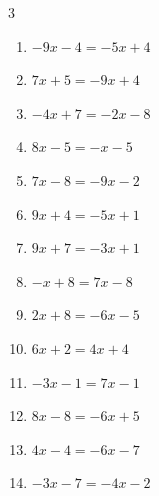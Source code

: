 \begin{multicols}{3}
\begin{enumerate}

  \item $-9x-4=-5x+4$

        \phantom{$\displaystyle x=-2$}

  \item $7x+5=-9x+4$


  \item $-4x+7=-2x-8$


  \item $8x-5=-x-5$

        \phantom{$\displaystyle x=0$}

\columnbreak %

  \item $7x-8=-9x-2$


  \item $9x+4=-5x+1$


  \item $9x+7=-3x+1$


  \item $-x+8=7x-8$

        \phantom{$\displaystyle x=2$}

  \item $2x+8=-6x-5$


  \item $6x+2=4x+4$

        \phantom{$\displaystyle x=1$}

  \item $-3x-1=7x-1$

        \phantom{$\displaystyle x=0$}

  \item $8x-8=-6x+5$


  \item $4x-4=-6x-7$


  \item $-3x-7=-4x-2$


\end{enumerate}
\end{multicols}
